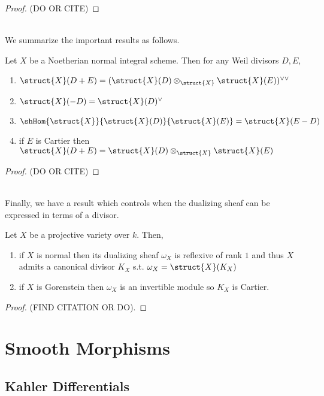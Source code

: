 \documentclass[12pt]{article}
\begin{document}
\begin{proof}
(DO OR CITE)
\end{proof}
\noindent\\
We summarize the important results as follows.
\begin{theorem}
Let $X$ be a Noetherian normal integral scheme. Then for any Weil divisors $D, E$,
\begin{enumerate}
\item $\struct{X}(D + E) = (\struct{X}(D) \otimes_{\struct{X}} \struct{X}(E))^{\vee \vee}$
\item $\struct{X}(-D) = \struct{X}(D)^\vee$
\item $\shHom{\struct{X}}{\struct{X}(D)}{\struct{X}(E)} = \struct{X}(E - D)$
\item if $E$ is Cartier then $\struct{X}(D + E) = \struct{X}(D) \otimes_{\struct{X}} \struct{X}(E)$
\end{enumerate}
\begin{center}

\begin{proof}
(DO OR CITE)
\end{proof}

\end{center}
\end{theorem}
\noindent\\
Finally, we have a result which controls when the dualizing sheaf can be expressed in terms of a divisor.
\begin{prop}
Let $X$ be a projective variety over $k$. Then,
\begin{enumerate}
\item if $X$ is normal then its dualizing sheaf $\omega_X$ is reflexive of rank $1$ and thus $X$ admits a canonical divisor $K_X$ s.t. $\omega_X = \struct{X}(K_X)$
\item if $X$ is Gorenstein then $\omega_X$ is an invertible module so $K_X$ is Cartier.
\end{enumerate}
\end{prop}

\begin{proof}
(FIND CITATION OR DO).
\end{proof}



\section{Smooth Morphisms}

\subsection{Kahler Differentials}
\end{document}
